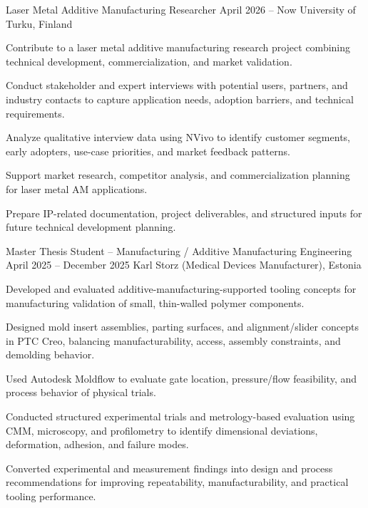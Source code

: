 \ExperienceHeader
{Laser Metal Additive Manufacturing Researcher}
{April 2026 -- Now}
{University of Turku, Finland}

\begin{cvitems}
  \item Contribute to a laser metal additive manufacturing research project combining technical development, commercialization, and market validation.
  \item Conduct stakeholder and expert interviews with potential users, partners, and industry contacts to capture application needs, adoption barriers, and technical requirements.
  \item Analyze qualitative interview data using NVivo to identify customer segments, early adopters, use-case priorities, and market feedback patterns.
  \item Support market research, competitor analysis, and commercialization planning for laser metal AM applications.
  \item Prepare IP-related documentation, project deliverables, and structured inputs for future technical development planning.
\end{cvitems}

\ExperienceHeader
{Master Thesis Student -- Manufacturing / Additive Manufacturing Engineering}
{April 2025 -- December 2025}
{Karl Storz (Medical Devices Manufacturer), Estonia}

\begin{cvitems}
  \item Developed and evaluated additive-manufacturing-supported tooling concepts for manufacturing validation of small, thin-walled polymer components.
  \item Designed mold insert assemblies, parting surfaces, and alignment/slider concepts in PTC Creo, balancing manufacturability, access, assembly constraints, and demolding behavior.
  \item Used Autodesk Moldflow to evaluate gate location, pressure/flow feasibility, and process behavior of physical trials.
  \item Conducted structured experimental trials and metrology-based evaluation using CMM, microscopy, and profilometry to identify dimensional deviations, deformation, adhesion, and failure modes.
  \item Converted experimental and measurement findings into design and process recommendations for improving repeatability, manufacturability, and practical tooling performance.
\end{cvitems}

